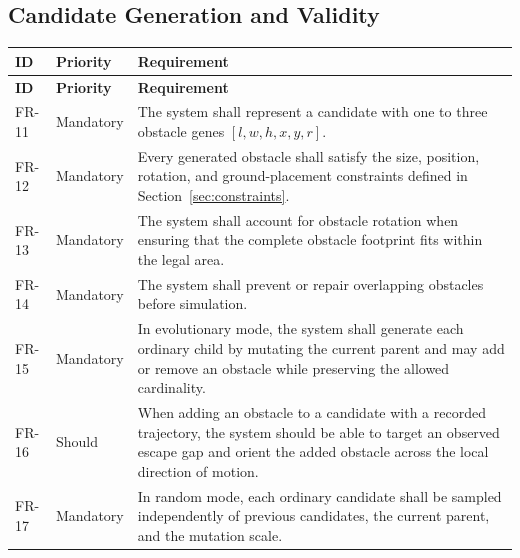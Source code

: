 \documentclass[11pt,a4paper,openany]{report}
\begin{document}
\subsection{Candidate Generation and Validity}
\begin{longtable}{L{1.7cm} L{2.1cm} L{10.8cm}}
\toprule
\textbf{ID} & \textbf{Priority} & \textbf{Requirement}\\
\midrule
\endfirsthead
\toprule
\textbf{ID} & \textbf{Priority} & \textbf{Requirement}\\
\midrule
\endhead
FR-11 & Mandatory & The system shall represent a candidate with one to three obstacle genes $[l,w,h,x,y,r]$.\\
FR-12 & Mandatory & Every generated obstacle shall satisfy the size, position, rotation, and ground-placement constraints defined in Section~\ref{sec:constraints}.\\
FR-13 & Mandatory & The system shall account for obstacle rotation when ensuring that the complete obstacle footprint fits within the legal area.\\
FR-14 & Mandatory & The system shall prevent or repair overlapping obstacles before simulation.\\
FR-15 & Mandatory & In evolutionary mode, the system shall generate each ordinary child by mutating the current parent and may add or remove an obstacle while preserving the allowed cardinality.\\
FR-16 & Should & When adding an obstacle to a candidate with a recorded trajectory, the system should be able to target an observed escape gap and orient the added obstacle across the local direction of motion.\\
FR-17 & Mandatory & In random mode, each ordinary candidate shall be sampled independently of previous candidates, the current parent, and the mutation scale.\\
\bottomrule
\end{longtable}
\end{document}
